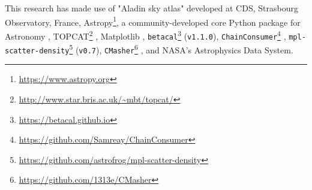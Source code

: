 \documentclass{aa}
\begin{document}
\begin{acknowledgements}
This research has made use of "Aladin sky atlas" \citep[\texttt{v11.0.24};][]{2000A&AS..143...33B} developed at CDS, Strasbourg Observatory, France, Astropy\footnote{\url{https://www.astropy.org}}, a community-developed core Python package for Astronomy \citep[\texttt{v5.0};][]{astropy:2013, astropy:2018, 2022ApJ...935..167A}, TOPCAT\footnote{\url{http://www.star.bris.ac.uk/~mbt/topcat/}} \citep{2005ASPC..347...29T}, Matplotlib \citep[\texttt{v3.5.1};][]{Hunter:2007}, \verb|betacal|\footnote{\url{https://betacal.github.io}} (\texttt{v1.1.0}), \verb|ChainConsumer|\footnote{\url{https://github.com/Samreay/ChainConsumer}} \citep[\texttt{v0.34};][]{Hinton2016}, \verb|mpl-scatter-density|\footnote{\url{https://github.com/astrofrog/mpl-scatter-density}} (\texttt{v0.7}), \verb|CMasher|\footnote{\url{https://github.com/1313e/CMasher}} \citep[\texttt{v1.6.3};][]{2020JOSS....5.2004V}, and NASA’s Astrophysics Data System.
\end{acknowledgements}

%
%


\end{document}
